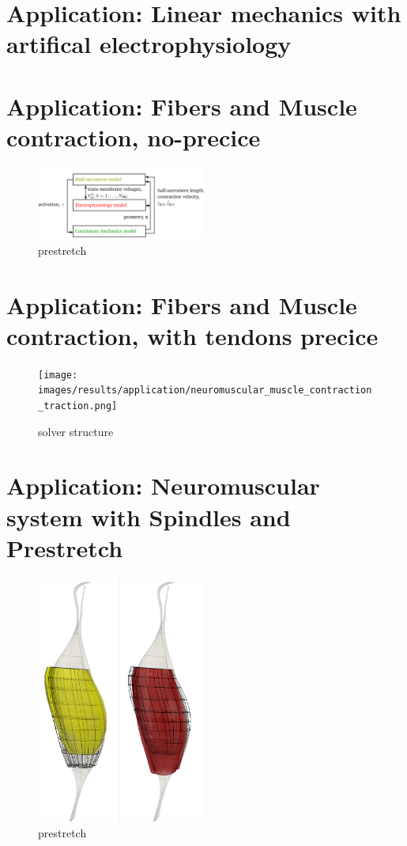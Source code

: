 \section{Application: Linear mechanics with artifical electrophysiology}
\section{Application: Fibers and Muscle contraction, no-precice}

\begin{figure}[H]
  \centering%
  \includegraphics[width=0.5\textwidth]{images/results/application/fibers_muscle_contraction_quantities.png}%
  \caption{prestretch}%
  \label{fig:prestrech1b}%
\end{figure}%
\section{Application: Fibers and Muscle contraction, with tendons precice}

\begin{figure}
  \centering%
  \texttt{[image: images/results/application/neuromuscular\_muscle\_contraction\_traction.png]}%
  \caption{solver structure}%
  \label{fig:neuromuscular_muscle_contraction_traction}%
\end{figure}%

\section{Application: Neuromuscular system with Spindles and Prestretch}

\begin{figure}[H]
  \centering%
  \includegraphics[width=0.5\textwidth]{images/results/application/neuromuscular_prestretch2c.png}%
  \caption{prestretch}%
  \label{fig:neuromuscular_prestretch2c}%
\end{figure}%

